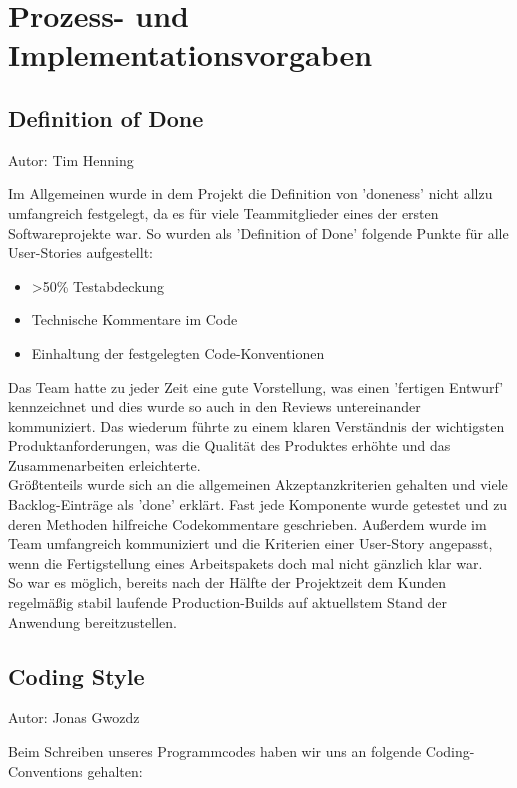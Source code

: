 \documentclass[twoside]{report}
\begin{document}
\section{Prozess- und Implementationsvorgaben}

\subsection{Definition of Done}
{\small Autor: Tim Henning}

Im Allgemeinen wurde in dem Projekt die Definition von 'doneness' nicht allzu umfangreich
festgelegt, da es für viele Teammitglieder eines der ersten Softwareprojekte war. So wurden als 'Definition of Done' folgende
Punkte für alle User-Stories aufgestellt:
\begin{itemize}
  \item >50\% Testabdeckung
  \item Technische Kommentare im Code
  \item Einhaltung der festgelegten Code-Konventionen
\end{itemize}
Das Team hatte zu jeder Zeit eine gute Vorstellung, was einen 'fertigen Entwurf' kennzeichnet und dies wurde so auch in den Reviews untereinander kommuniziert.
Das wiederum führte zu einem klaren Verständnis der wichtigsten Produktanforderungen, was die Qualität des Produktes erhöhte und das Zusammenarbeiten erleichterte.\\
Größtenteils wurde sich an die allgemeinen Akzeptanzkriterien gehalten und viele Backlog-Einträge als 'done' erklärt. Fast jede Komponente wurde
getestet und zu deren Methoden hilfreiche Codekommentare geschrieben.
Außerdem wurde im Team umfangreich kommuniziert und die Kriterien einer User-Story angepasst, wenn die Fertigstellung eines Arbeitspakets doch mal nicht gänzlich klar war.\\
So war es möglich, bereits nach der Hälfte der Projektzeit dem Kunden regelmäßig stabil laufende Production-Builds auf aktuellstem Stand der Anwendung bereitzustellen.

\newpage
\subsection{Coding Style}
{\small Autor: Jonas Gwozdz}

Beim Schreiben unseres Programmcodes haben wir uns an folgende Coding-Conventions gehalten:
\end{document}
